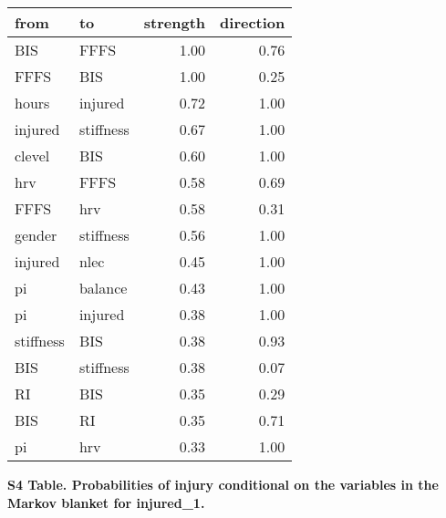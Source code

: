 \documentclass[
]{article}
\begin{document}
\begin{longtable}[t]{l|l|r|r}
\caption{\label{tab:unnamed-chunk-4}}\\
\hline
from & to & strength & direction\\
\hline
BIS & FFFS & 1.00 & 0.76\\
\hline
FFFS & BIS & 1.00 & 0.25\\
\hline
hours & injured & 0.72 & 1.00\\
\hline
injured & stiffness & 0.67 & 1.00\\
\hline
clevel & BIS & 0.60 & 1.00\\
\hline
hrv & FFFS & 0.58 & 0.69\\
\hline
FFFS & hrv & 0.58 & 0.31\\
\hline
gender & stiffness & 0.56 & 1.00\\
\hline
injured & nlec & 0.45 & 1.00\\
\hline
pi & balance & 0.43 & 1.00\\
\hline
pi & injured & 0.38 & 1.00\\
\hline
stiffness & BIS & 0.38 & 0.93\\
\hline
BIS & stiffness & 0.38 & 0.07\\
\hline
RI & BIS & 0.35 & 0.29\\
\hline
BIS & RI & 0.35 & 0.71\\
\hline
pi & hrv & 0.33 & 1.00\\
\hline
\end{longtable}

\newpage

\textbf{S4 Table. Probabilities of injury conditional on the variables in the Markov blanket for injured\_1.}
\end{document}
